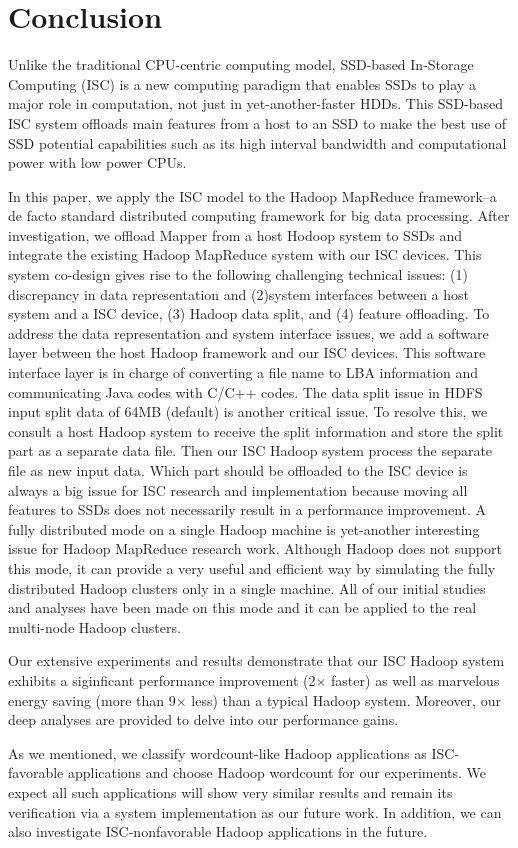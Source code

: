 
\section{Conclusion}\label{sec:conclusion}

Unlike the traditional CPU-centric computing model, SSD-based In-Storage Computing (ISC) is a new computing paradigm that enables SSDs to play a major role in computation, not just in yet-another-faster HDDs. This SSD-based ISC system offloads main features from a host to an SSD to make the best use of SSD potential capabilities such as its high interval bandwidth and computational power with low power CPUs. 

In this paper, we apply the ISC model to the Hadoop MapReduce framework--a de facto standard distributed computing framework for big data processing. After investigation, we offload Mapper from a host Hodoop system to SSDs and integrate the existing Hadoop MapReduce system with our ISC devices. This system co-design gives rise to the following challenging technical issues: (1) discrepancy in data representation and (2)system interfaces between a host system and a ISC device, (3) Hadoop data split, and (4) feature offloading. To address the data representation and system interface issues, we add a software layer between the host Hadoop framework and our ISC devices. This software interface layer is in charge of converting a file name to LBA information and communicating Java codes with C/C++ codes. The data split issue in HDFS input split data of 64MB (default) is another critical issue. To resolve this, we consult a host Hadoop system to receive the split information and store the split part as a separate data file. Then our ISC Hadoop system process the separate file as new input data. Which part should be offloaded to the ISC device is always a big issue for ISC research and implementation because moving all features to SSDs does not necessarily result in a performance improvement.
A fully distributed mode on a single Hadoop machine is yet-another interesting issue for Hadoop MapReduce research work. Although Hadoop does not support this mode, it can provide a very useful and efficient way by simulating the fully distributed Hadoop clusters only in a single machine. All of our initial studies and analyses have been made on this mode and it can be applied to the real multi-node Hadoop clusters.

Our extensive experiments and results demonstrate that our ISC Hadoop system exhibits a siginficant performance improvement (2$\times$ faster) as well as marvelous energy saving (more than 9$\times$ less) than a typical Hadoop system. Moreover, our deep analyses are provided to delve into our performance gains.

As we mentioned, we classify wordcount-like Hadoop applications as ISC-favorable applications and choose Hadoop wordcount for our experiments. We expect all such applications will show very similar results and remain its verification via a system implementation as our future work. In addition, we can also investigate ISC-nonfavorable Hadoop applications in the future.

